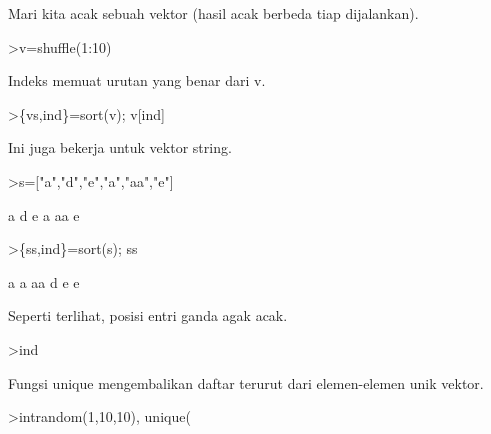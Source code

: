 \documentclass[a4paper,10pt]{article}
\begin{document}
\begin{eulernotebook}
\begin{eulercomment}
\begin{eulercomment}
\begin{eulercomment}
\begin{eulercomment}
\begin{eulercomment}
\begin{eulercomment}
\begin{eulercomment}
\begin{eulercomment}
\begin{eulercomment}
\begin{eulercomment}
\begin{eulercomment}
\begin{eulercomment}
\begin{eulercomment}
\begin{eulercomment}
\begin{eulercomment}
\begin{eulercomment}
\begin{eulercomment}
\begin{eulercomment}
\begin{eulercomment}
\begin{eulercomment}
\begin{eulercomment}
Mari kita acak sebuah vektor (hasil acak berbeda tiap dijalankan).
\end{eulercomment}
\begin{eulerprompt}
>v=shuffle(1:10)
\end{eulerprompt}
\begin{euleroutput}
  [5,  3,  7,  10,  6,  2,  1,  4,  9,  8]
\end{euleroutput}
\begin{eulercomment}
Indeks memuat urutan yang benar dari v.
\end{eulercomment}
\begin{eulerprompt}
>\{vs,ind\}=sort(v); v[ind]
\end{eulerprompt}
\begin{euleroutput}
  [1,  2,  3,  4,  5,  6,  7,  8,  9,  10]
\end{euleroutput}
\begin{eulercomment}
Ini juga bekerja untuk vektor string.
\end{eulercomment}
\begin{eulerprompt}
>s=["a","d","e","a","aa","e"]
\end{eulerprompt}
\begin{euleroutput}
  a
  d
  e
  a
  aa
  e
\end{euleroutput}
\begin{eulerprompt}
>\{ss,ind\}=sort(s); ss
\end{eulerprompt}
\begin{euleroutput}
  a
  a
  aa
  d
  e
  e
\end{euleroutput}
\begin{eulercomment}
Seperti terlihat, posisi entri ganda agak acak.
\end{eulercomment}
\begin{eulerprompt}
>ind
\end{eulerprompt}
\begin{euleroutput}
  [4,  1,  5,  2,  6,  3]
\end{euleroutput}
\begin{eulercomment}
Fungsi unique mengembalikan daftar terurut dari elemen-elemen unik vektor.
\end{eulercomment}
\begin{eulerprompt}
>intrandom(1,10,10), unique(%
\end{eulerprompt}
\begin{euleroutput}
  [2,  3,  8,  1,  4,  4,  9,  2,  6,  5]

\end{euleroutput}
\end{eulercomment}
\end{eulercomment}
\end{eulercomment}
\end{eulercomment}
\end{eulercomment}
\end{eulercomment}
\end{eulercomment}
\end{eulercomment}
\end{eulercomment}
\end{eulercomment}
\end{eulercomment}
\end{eulercomment}
\end{eulercomment}
\end{eulercomment}
\end{eulercomment}
\end{eulercomment}
\end{eulercomment}
\end{eulercomment}
\end{eulercomment}
\end{eulercomment}
\end{eulernotebook}
\end{document}
